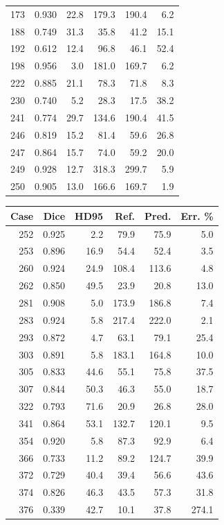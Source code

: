 \begin{table}[H]
\begin{minipage}{0.45\linewidth}
\begin{tabular}{rrrrrr}
173 & 0.930 & 22.8 & 179.3 & 190.4 & 6.2\\
188 & 0.749 & 31.3 & 35.8 & 41.2 & 15.1\\
192 & 0.612 & 12.4 & 96.8 & 46.1 & 52.4\\
198 & 0.956 & 3.0 & 181.0 & 169.7 & 6.2\\
222 & 0.885 & 21.1 & 78.3 & 71.8 & 8.3\\
230 & 0.740 & 5.2 & 28.3 & 17.5 & 38.2\\
241 & 0.774 & 29.7 & 134.6 & 190.4 & 41.5\\
246 & 0.819 & 15.2 & 81.4 & 59.6 & 26.8\\
247 & 0.864 & 15.7 & 74.0 & 59.2 & 20.0\\
249 & 0.928 & 12.7 & 318.3 & 299.7 & 5.9\\
250 & 0.905 & 13.0 & 166.6 & 169.7 & 1.9\\
\bottomrule
\end{tabular}
\end{minipage}\hfill
\begin{minipage}{0.45\linewidth}
\centering
\begin{tabular}{rrrrrr}
\toprule
Case & Dice & HD95 & Ref. & Pred. & Err. \%\\
\midrule
252 & 0.925 & 2.2 & 79.9 & 75.9 & 5.0\\
253 & 0.896 & 16.9 & 54.4 & 52.4 & 3.5\\
260 & 0.924 & 24.9 & 108.4 & 113.6 & 4.8\\
262 & 0.850 & 49.5 & 23.9 & 20.8 & 13.0\\
281 & 0.908 & 5.0 & 173.9 & 186.8 & 7.4\\
283 & 0.924 & 5.8 & 217.4 & 222.0 & 2.1\\
293 & 0.872 & 4.7 & 63.1 & 79.1 & 25.4\\
303 & 0.891 & 5.8 & 183.1 & 164.8 & 10.0\\
305 & 0.833 & 44.6 & 55.1 & 75.8 & 37.5\\
307 & 0.844 & 50.3 & 46.3 & 55.0 & 18.7\\
322 & 0.793 & 71.6 & 20.9 & 26.8 & 28.0\\
341 & 0.864 & 53.1 & 132.7 & 120.1 & 9.5\\
354 & 0.920 & 5.8 & 87.3 & 92.9 & 6.4\\
366 & 0.733 & 11.2 & 89.2 & 124.7 & 39.9\\
372 & 0.729 & 40.4 & 39.4 & 56.6 & 43.6\\
374 & 0.826 & 46.3 & 43.5 & 57.3 & 31.8\\
376 & 0.339 & 42.7 & 10.1 & 37.8 & 274.1\\

\end{tabular}
\end{minipage}
\end{table}

